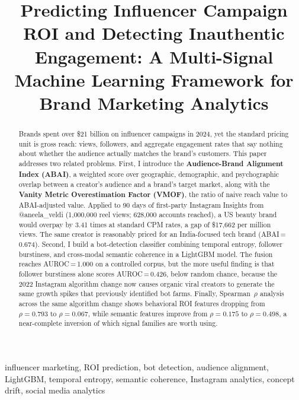 \documentclass[conference]{IEEEtran}
\begin{document}
\title{Predicting Influencer Campaign ROI and Detecting Inauthentic Engagement:
A Multi-Signal Machine Learning Framework for Brand Marketing Analytics}

\author{
}

\maketitle

\begin{abstract}
Brands spent over \$21 billion on influencer campaigns in 2024, yet the
standard pricing unit is gross reach: views, followers, and aggregate
engagement rates that say nothing about whether the audience actually
matches the brand's customers. This paper addresses two related problems.
First, I introduce the \textbf{Audience-Brand Alignment Index (ABAI)}, a
weighted score over geographic, demographic, and psychographic overlap
between a creator's audience and a brand's target market, along with the
\textbf{Vanity Metric Overestimation Factor (VMOF)}, the ratio of
naive reach value to ABAI-adjusted value. Applied to 90 days of
first-party Instagram Insights from @aneela\_veldi (1{,}000{,}000 reel
views; 628{,}000 accounts reached), a US beauty brand would overpay by
3.41 times at standard CPM rates, a gap of \$17{,}662 per million views.
The same creator is reasonably priced for an India-focused tech brand
(ABAI\,=\,0.674). Second, I build a bot-detection classifier combining
temporal entropy, follower burstiness, and cross-modal semantic coherence
in a LightGBM model. The fusion reaches AUROC\,=\,1.000 on a controlled
corpus, but the more useful finding is that follower burstiness alone
scores AUROC\,=\,0.426, below random chance, because the 2022 Instagram
algorithm change now causes organic viral creators to generate the same
growth spikes that previously identified bot farms. Finally, Spearman~$\rho$
analysis across the same algorithm change shows behavioral ROI features
dropping from $\rho=0.793$ to $\rho=0.067$, while semantic features improve
from $\rho=0.175$ to $\rho=0.498$, a near-complete inversion of which
signal families are worth using.
\end{abstract}

\begin{IEEEkeywords}
influencer marketing, ROI prediction, bot detection, audience alignment,
LightGBM, temporal entropy, semantic coherence, Instagram analytics,
concept drift, social media analytics
\end{IEEEkeywords}
\end{document}
